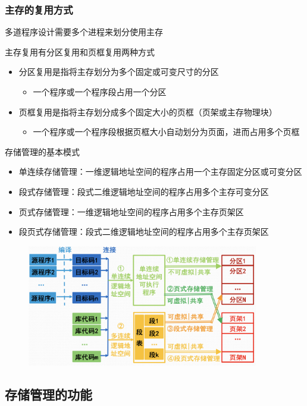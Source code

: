\documentclass[cs4size,a4paper,10pt]{ctexart}
\begin{document}
	\subsubsection{主存的复用方式}
	多道程序设计需要多个进程来划分使用主存

	主存复用有分区复用和页框复用两种方式
	\begin{itemize}
		\item 分区复用是指将主存划分为多个固定或可变尺寸的分区
		\begin{itemize}
			\item 一个程序或一个程序段占用一个分区
		\end{itemize}
		\item 页框复用是指将主存划分成多个固定大小的页框（页架或主存物理块）
		\begin{itemize}
			\item 一个程序或一个程序段根据页框大小自动划分为页面，进而占用多个页框
		\end{itemize}
	\end{itemize}

	存储管理的基本模式
	\begin{itemize}
		\item 单连续存储管理：一维逻辑地址空间的程序占用一个主存固定分区或可变分区
		\item 段式存储管理：段式二维逻辑地址空间的程序占用多个主存可变分区
		\item 页式存储管理：一维逻辑地址空间的程序占用多个主存页架区
		\item 段页式存储管理：段式二维逻辑地址空间的程序占用多个主存页架区
	\end{itemize}
	\begin{figure}[H]
		\centering
		\includegraphics[width=0.9\textwidth]{img/3.1.1.2}
	\end{figure}

	\subsection{存储管理的功能}
\end{document}
